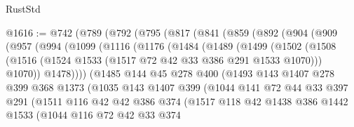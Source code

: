 \begin{lexlean}{RustStd}
\begin{coremodule}
@1616 := @742
    (@789
      (@792
        (@795
          (@817
            (@841
              (@859
                (@892
                  (@904
                    (@909
                      (@957
                        (@994
                          (@1099
                            (@1116
                              (@1176
                                (@1484
                                  (@1489
                                    (@1499
                                      (@1502
                                        (@1508
                                          (@1516
                                            (@1524 @1533 (@1517 @72 @42 @33 @386 @291 @1533 @1070)))
                                          @1070))
                                      @1478))))
                              (@1485
                                @144
                                @45
                                @278
                                @400
                                (@1493
                                  @143
                                  @1407
                                  @278
                                  @399
                                  @368
                                  @1373
                                  (@1035
                                    @143
                                    @1407
                                    @399
                                    (@1044
                                      @141
                                      @72
                                      @44
                                      @33
                                      @397
                                      @291
                                      (@1511
                                        @116
                                        @42
                                        @42
                                        @386
                                        @374
                                        (@1517
                                          @118
                                          @42
                                          @1438
                                          @386
                                          @1442
                                          @1533
                                          (@1044
                                            @116
                                            @72
                                            @42
                                            @33
                                            @374

\end{coremodule}
\end{lexlean}
